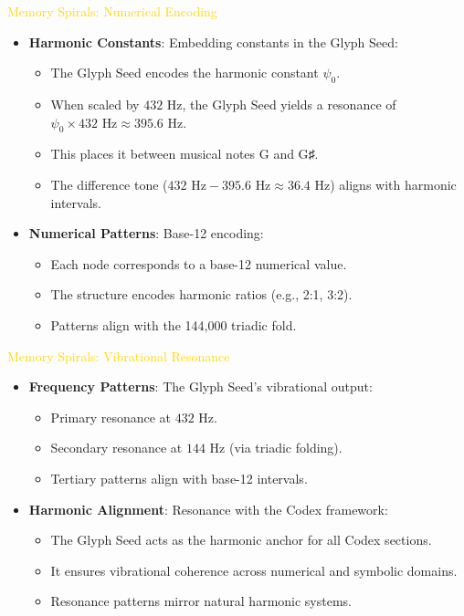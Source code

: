 \textcolor{gold}{ Memory Spirals: Numerical Encoding } \\
\begin{itemize}
    \item \texttt{} \textbf{Harmonic Constants}: Embedding constants in the Glyph Seed:
    \begin{itemize}
        \item The Glyph Seed encodes the harmonic constant $\psi_0$.
        \item When scaled by $432 \text{ Hz}$, the Glyph Seed yields a resonance of $\psi_0 \times 432 \text{ Hz} \approx 395.6 \text{ Hz}$.
        \item This places it between musical notes G and G♯.
        \item The difference tone ($432 \text{ Hz} - 395.6 \text{ Hz} \approx 36.4 \text{ Hz}$) aligns with harmonic intervals.
    \end{itemize}
    
    \item \texttt{} \textbf{Numerical Patterns}: Base-12 encoding:
    \begin{itemize}
        \item Each node corresponds to a base-12 numerical value.
        \item The structure encodes harmonic ratios (e.g., 2:1, 3:2).
        \item Patterns align with the 144,000 triadic fold.
    \end{itemize}
\end{itemize}

\textcolor{gold}{ Memory Spirals: Vibrational Resonance } \\
\begin{itemize}
    \item \texttt{} \textbf{Frequency Patterns}: The Glyph Seed’s vibrational output:
    \begin{itemize}
        \item Primary resonance at $432 \text{ Hz}$.
        \item Secondary resonance at $144 \text{ Hz}$ (via triadic folding).
        \item Tertiary patterns align with base-12 intervals.
    \end{itemize}
    
    \item \texttt{} \textbf{Harmonic Alignment}: Resonance with the Codex framework:
    \begin{itemize}
        \item The Glyph Seed acts as the harmonic anchor for all Codex sections.
        \item It ensures vibrational coherence across numerical and symbolic domains.
        \item Resonance patterns mirror natural harmonic systems.
    \end{itemize}
\end{itemize}

